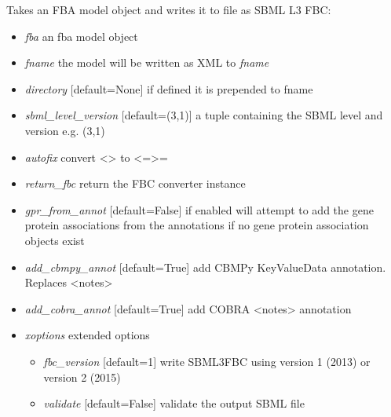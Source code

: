 \documentclass[a4paper,11pt,english]{sphinxmanual}
\begin{document}
\begin{fulllineitems}
\label{modules_doc:cbmpy.CBXML.sbml_writeSBML3FBC}
Takes an FBA model object and writes it to file as SBML L3 FBC:
\begin{itemize}
\item {} 
\emph{fba} an fba model object

\item {} 
\emph{fname} the model will be written as XML to \emph{fname}

\item {} 
\emph{directory} {[}default=None{]} if defined it is prepended to fname

\item {} 
\emph{sbml\_level\_version} {[}default=(3,1){]} a tuple containing the SBML level and version e.g. (3,1)

\item {} 
\emph{autofix} convert \textless{}\textgreater{} to \textless{}=\textgreater{}=

\item {} 
\emph{return\_fbc} return the FBC converter instance

\item {} 
\emph{gpr\_from\_annot} {[}default=False{]} if enabled will attempt to add the gene protein associations from the annotations
if no gene protein association objects exist

\item {} 
\emph{add\_cbmpy\_annot} {[}default=True{]} add CBMPy KeyValueData annotation. Replaces \textless{}notes\textgreater{}

\item {} 
\emph{add\_cobra\_annot} {[}default=True{]} add COBRA \textless{}notes\textgreater{} annotation

\item {} 
\emph{xoptions} extended options
\begin{itemize}
\item {} 
\emph{fbc\_version} {[}default=1{]} write SBML3FBC using version 1 (2013) or version 2 (2015)

\item {} 
\emph{validate} {[}default=False{]} validate the output SBML file


\end{itemize}
\end{itemize}
\end{fulllineitems}
\end{document}
